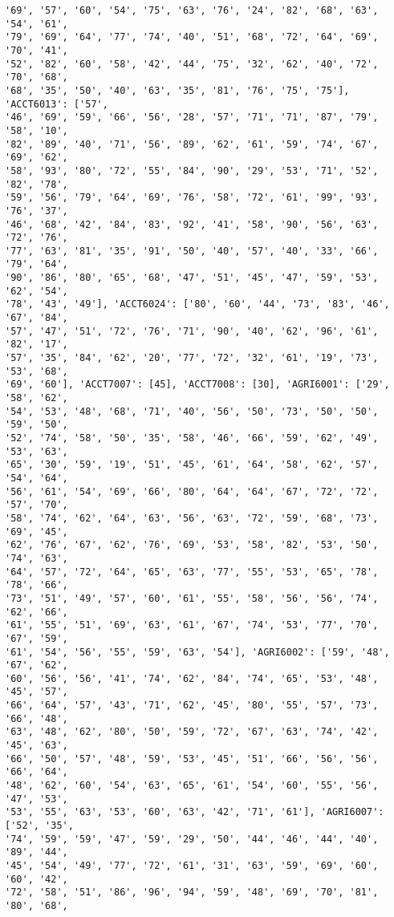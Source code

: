 \documentclass[11pt]{article}
\begin{document}
\begin{Verbatim}[commandchars=\\\{\}]
'69', '57', '60', '54', '75', '63', '76', '24', '82', '68', '63', '54', '61',
'79', '69', '64', '77', '74', '40', '51', '68', '72', '64', '69', '70', '41',
'52', '82', '60', '58', '42', '44', '75', '32', '62', '40', '72', '70', '68',
'68', '35', '50', '40', '63', '35', '81', '76', '75', '75'], 'ACCT6013': ['57',
'46', '69', '59', '66', '56', '28', '57', '71', '71', '87', '79', '58', '10',
'82', '89', '40', '71', '56', '89', '62', '61', '59', '74', '67', '69', '62',
'58', '93', '80', '72', '55', '84', '90', '29', '53', '71', '52', '82', '78',
'59', '56', '79', '64', '69', '76', '58', '72', '61', '99', '93', '76', '37',
'46', '68', '42', '84', '83', '92', '41', '58', '90', '56', '63', '72', '76',
'77', '63', '81', '35', '91', '50', '40', '57', '40', '33', '66', '79', '64',
'90', '86', '80', '65', '68', '47', '51', '45', '47', '59', '53', '62', '54',
'78', '43', '49'], 'ACCT6024': ['80', '60', '44', '73', '83', '46', '67', '84',
'57', '47', '51', '72', '76', '71', '90', '40', '62', '96', '61', '82', '17',
'57', '35', '84', '62', '20', '77', '72', '32', '61', '19', '73', '53', '68',
'69', '60'], 'ACCT7007': [45], 'ACCT7008': [30], 'AGRI6001': ['29', '58', '62',
'54', '53', '48', '68', '71', '40', '56', '50', '73', '50', '50', '59', '50',
'52', '74', '58', '50', '35', '58', '46', '66', '59', '62', '49', '53', '63',
'65', '30', '59', '19', '51', '45', '61', '64', '58', '62', '57', '54', '64',
'56', '61', '54', '69', '66', '80', '64', '64', '67', '72', '72', '57', '70',
'58', '74', '62', '64', '63', '56', '63', '72', '59', '68', '73', '69', '45',
'62', '76', '67', '62', '76', '69', '53', '58', '82', '53', '50', '74', '63',
'64', '57', '72', '64', '65', '63', '77', '55', '53', '65', '78', '78', '66',
'73', '51', '49', '57', '60', '61', '55', '58', '56', '56', '74', '62', '66',
'61', '55', '51', '69', '63', '61', '67', '74', '53', '77', '70', '67', '59',
'61', '54', '56', '55', '59', '63', '54'], 'AGRI6002': ['59', '48', '67', '62',
'60', '56', '56', '41', '74', '62', '84', '74', '65', '53', '48', '45', '57',
'66', '64', '57', '43', '71', '62', '45', '80', '55', '57', '73', '66', '48',
'63', '48', '62', '80', '50', '59', '72', '67', '63', '74', '42', '45', '63',
'66', '50', '57', '48', '59', '53', '45', '51', '66', '56', '56', '66', '64',
'48', '62', '60', '54', '63', '65', '61', '54', '60', '55', '56', '47', '53',
'53', '55', '63', '53', '60', '63', '42', '71', '61'], 'AGRI6007': ['52', '35',
'74', '59', '59', '47', '59', '29', '50', '44', '46', '44', '40', '89', '44',
'45', '54', '49', '77', '72', '61', '31', '63', '59', '69', '60', '60', '42',
'72', '58', '51', '86', '96', '94', '59', '48', '69', '70', '81', '80', '68',

\end{Verbatim}
\end{document}
